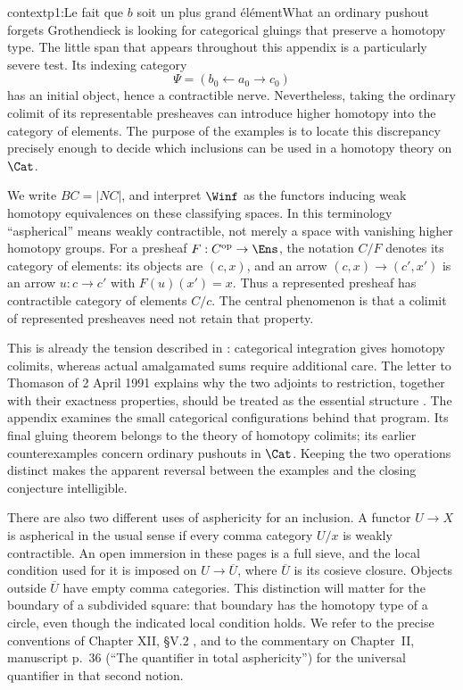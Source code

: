 \begin{dcomment}{context}{p1:Le fait que $b$ soit un plus grand élément}{What an ordinary pushout forgets}
Grothendieck is looking for categorical gluings that preserve a homotopy type. The little span that appears throughout this appendix is a particularly severe test. Its indexing category
\[
  \Psi=(b_0\longleftarrow a_0\longrightarrow c_0)
\]
has an initial object, hence a contractible nerve. Nevertheless, taking the ordinary colimit of its representable presheaves can introduce higher homotopy into the category of elements. The purpose of the examples is to locate this discrepancy precisely enough to decide which inclusions can be used in a homotopy theory on \(\Cat\).

We write \(BC=|NC|\), and interpret \(\Winf\) as the functors inducing weak homotopy equivalences on these classifying spaces. In this terminology ``aspherical'' means weakly contractible, not merely a space with vanishing higher homotopy groups. For a presheaf \(F:C^{\mathrm{op}}\to\Ens\), the notation \(C/F\) denotes its category of elements: its objects are \((c,x)\), and an arrow \((c,x)\to(c',x')\) is an arrow \(u:c\to c'\) with \(F(u)(x')=x\). Thus a represented presheaf has contractible category of elements \(C/c\). The central phenomenon is that a colimit of represented presheaves need not retain that property.

This is already the tension described in \citet[\S69]{Grothendieck1983}: categorical integration gives homotopy colimits, whereas actual amalgamated sums require additional care. The letter to Thomason of 2 April 1991 explains why the two adjoints to restriction, together with their exactness properties, should be treated as the essential structure \citep[pp.~8--9]{Grothendieck1991Letter}. The appendix examines the small categorical configurations behind that program. Its final gluing theorem belongs to the theory of homotopy colimits; its earlier counterexamples concern ordinary pushouts in \(\Cat\). Keeping the two operations distinct makes the apparent reversal between the examples and the closing conjecture intelligible.

There are also two different uses of asphericity for an inclusion. A functor \(U\to X\) is aspherical in the usual sense if every comma category \(U/x\) is weakly contractible. An open immersion in these pages is a full sieve, and the local condition used for it is imposed on \(U\to\overline U\), where \(\overline U\) is its cosieve closure. Objects outside \(\overline U\) have empty comma categories. This distinction will matter for the boundary of a subdivided square: that boundary has the homotopy type of a circle, even though the indicated local condition holds. We refer to the precise conventions of Chapter XII, \S V.2 \citep{Grothendieck1990XII}, and to the commentary on Chapter~II, manuscript p.~36 (``The quantifier in total asphericity'') for the universal quantifier in that second notion.
\end{dcomment}

